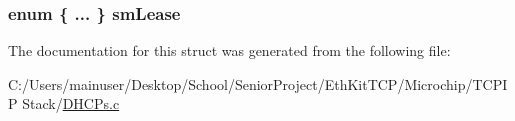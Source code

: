\subsubsection[{sm\+Lease}]{\setlength{\rightskip}{0pt plus 5cm}enum \{ ... \}   sm\+Lease}\label{struct_d_h_c_p___c_o_n_t_r_o_l___b_l_o_c_k_aab31659bde9e9e1a983743978966010d}


The documentation for this struct was generated from the following file\+:\begin{DoxyCompactItemize}
\item 
C\+:/\+Users/mainuser/\+Desktop/\+School/\+Senior\+Project/\+Eth\+Kit\+T\+C\+P/\+Microchip/\+T\+C\+P\+I\+P Stack/\hyperlink{_d_h_c_ps_8c}{D\+H\+C\+Ps.\+c}\end{DoxyCompactItemize}
